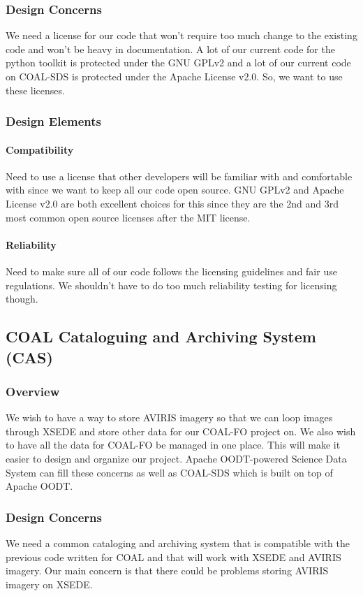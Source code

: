 \documentclass[10pt,draftclsnofoot,onecolumn,journal,compsoc]{IEEEtran}
\begin{document}
\subsubsection{Design Concerns}
We need a license for our code that won’t require too much change to the existing code and won’t be heavy in documentation. A lot of our current code for the python toolkit is protected under the GNU GPLv2 and a lot of our current code on COAL-SDS is protected under the Apache License v2.0. So, we want to use these licenses.
\subsubsection{Design Elements}
\paragraph{Compatibility}
Need to use a license that other developers will be familiar with and comfortable with since we want to keep all our code open source. GNU GPLv2 and Apache License v2.0 are both excellent choices for this since they are the 2nd and 3rd most common open source licenses after the MIT license.
\paragraph{Reliability}
Need to make sure all of our code follows the licensing guidelines and fair use regulations. We shouldn't have to do too much reliability testing for licensing though.

\subsection{COAL Cataloguing and Archiving System (CAS)}
\subsubsection{Overview}
\noindent We wish to have a way to store AVIRIS imagery so that we can loop images through XSEDE and store other data for our COAL-FO project on. We also wish to have all the data for COAL-FO be managed in one place. This will make it easier to design and organize our project. Apache OODT-powered Science Data System can fill these concerns as well as COAL-SDS which is built on top of Apache OODT.
\subsubsection{Design Concerns}
We need a common cataloging and archiving system that is compatible with the previous code written for COAL and that will work with XSEDE and AVIRIS imagery. Our main concern is that there could be problems storing AVIRIS imagery on XSEDE.
\end{document}
